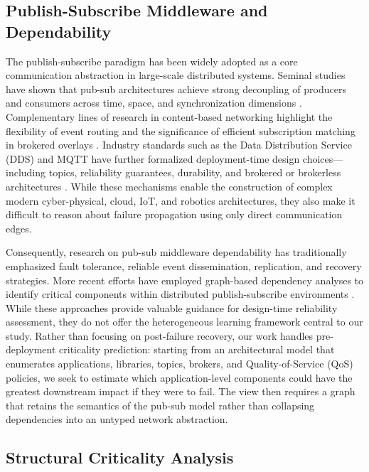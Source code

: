 \documentclass[sigconf,9pt,anonymous]{acmart}
\begin{document}
\subsection{Publish-Subscribe Middleware and Dependability}

The publish-subscribe paradigm has been widely adopted as a core communication abstraction in large-scale distributed systems. Seminal studies have shown that pub-sub architectures achieve strong decoupling of producers and consumers across time, space, and synchronization dimensions \cite{eugster2003many}. Complementary lines of research in content-based networking highlight the flexibility of event routing and the significance of efficient subscription matching in brokered overlays \cite{carzaniga2001design}. Industry standards such as the Data Distribution Service (DDS) and MQTT have further formalized deployment-time design choices—including topics, reliability guarantees, durability, and brokered or brokerless architectures \cite{omg2015dds, banks2019mqtt}. While these mechanisms enable the construction of complex modern cyber-physical, cloud, IoT, and robotics architectures, they also make it difficult to reason about failure propagation using only direct communication edges.

Consequently, research on pub-sub middleware dependability has traditionally emphasized fault tolerance, reliable event dissemination, replication, and recovery strategies. More recent efforts have employed graph-based dependency analyses to identify critical components within distributed publish-subscribe environments \cite{yigit2025graphbased}. While these approaches provide valuable guidance for design-time reliability assessment, they do not offer the heterogeneous learning framework central to our study. Rather than focusing on post-failure recovery, our work handles pre-deployment criticality prediction: starting from an architectural model that enumerates applications, libraries, topics, brokers, and Quality-of-Service (QoS) policies, we seek to estimate which application-level components could have the greatest downstream impact if they were to fail. The view then requires a graph that retains the semantics of the pub-sub model rather than collapsing dependencies into an untyped network abstraction.

\subsection{Structural Criticality Analysis}
\end{document}
